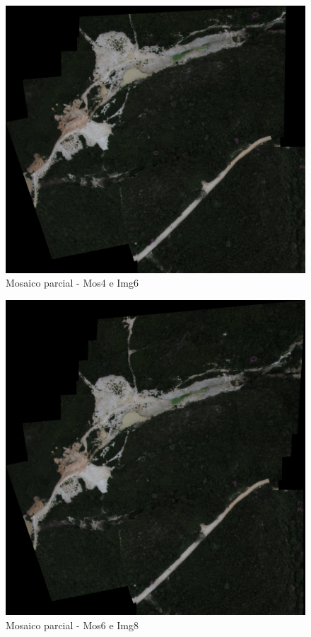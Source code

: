\documentclass[9pt, a4paper, nofonttune, journal]{IEEEtran}
\begin{document}
\begin{figure}[!h]
\begin{center}
\includegraphics[scale=0.25]{figuras/Mosaic5}
\caption{Mosaico parcial - Mos4 e Img6}
\label{fig:mosaico}
\end{center}
\end{figure}

\begin{figure}[!h]
\begin{center}
\includegraphics[scale=0.25]{figuras/Mosaic7}
\caption{Mosaico parcial - Mos6 e Img8}
\label{fig:mosaico}
\end{center}
\end{figure}
\end{document}
